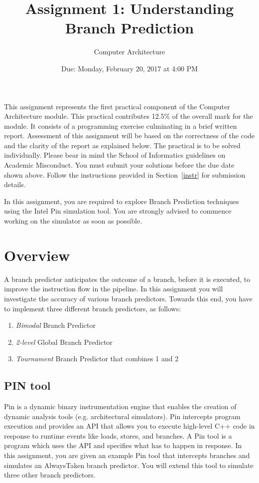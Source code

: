 \documentclass[a4paper,12pt]{article}
\title{\textbf{Assignment 1: Understanding Branch
Prediction}}
\date{Due: Monday, February 20, 2017 at 4:00 PM}
\author[]{Computer Architecture}
\newcommand\boris[1]{{\color{blue}#1}}
\theoremstyle{plain}
\begin{document}
\maketitle


This assignment represents the first practical component of the Computer Architecture module. This practical contributes 12.5\% of the overall mark for the module. It consists of a programming exercise culminating in a brief written report. Assessment of this assignment will be based on the correctness of the code and the clarity of the report as explained below. The practical is to be solved individually. Please bear in mind the School of Informatics guidelines on Academic Misconduct. You must submit your solutions before the due date shown above. Follow the instructions provided in Section~\ref{instr}  for submission details. 

In this assignment, you are required to explore Branch Prediction techniques using the Intel Pin simulation tool. You are strongly advised to commence working on the simulator as soon as possible. 

\section{Overview}
A branch predictor anticipates the outcome of a branch, before it is executed, to improve the instruction flow in the pipeline. In this assignment you will investigate the accuracy of various branch predictors. Towards this end, you have to implement three different branch predictors, as follows:
\begin{enumerate}
\item {\em Bimodal} Branch Predictor
\item {\em 2-level} Global Branch Predictor
\item {\em Tournament} Branch Predictor that combines 1 and 2
\end{enumerate}
\subsection{PIN tool}

Pin is a dynamic binary instrumentation engine that enables the creation of 
dynamic analysis tools (e.g. architectural simulators). Pin intercepts program execution and provides an API that allows you to execute high-level C++ code in response to runtime  events like loads, stores, and branches. A Pin tool is a program which uses the API and specifies what has to happen in response. In this assignment, you are given an example Pin tool that intercepts branches and simulates an AlwaysTaken branch predictor. You will extend this tool to simulate three other branch predictors. 
\end{document}

